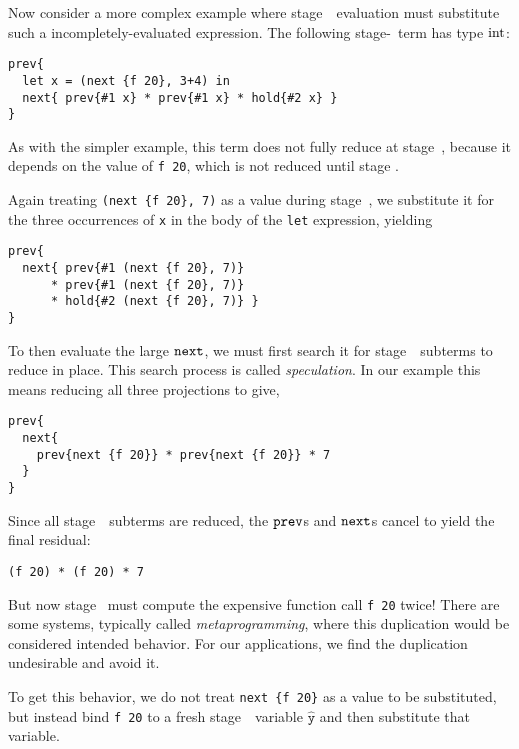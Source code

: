 Now consider a more complex example where stage~\bbone\ evaluation must
substitute such a incompletely-evaluated expression. The following
stage-\bbtwo\ term has type ${\rm int}$:
\begin{lstlisting} 
prev{
  let x = (next {f 20}, 3+4) in
  next{ prev{#1 x} * prev{#1 x} * hold{#2 x} }
}
\end{lstlisting}
As with the simpler example, this term does not fully reduce at stage~\bbone, 
because it depends on the value of \verb|f 20|, which is not reduced until stage \bbtwo.

Again treating \verb|(next {f 20}, 7)| as a value during stage~\bbone, we
substitute it for the three occurrences of \verb|x| in the body of the
\verb|let| expression, yielding
\begin{lstlisting} 
prev{
  next{ prev{#1 (next {f 20}, 7)} 
      * prev{#1 (next {f 20}, 7)} 
      * hold{#2 (next {f 20}, 7)} }
}
\end{lstlisting}
To then evaluate the large ${\tt next}$, we must first search it for stage~\bbone\ subterms to reduce in place.
This search process is called {\em speculation}.
In our example this means reducing all three projections to give,
\begin{lstlisting} 
prev{
  next{ 
    prev{next {f 20}} * prev{next {f 20}} * 7 
  }
}
\end{lstlisting}
Since all stage~\bbone\ subterms are reduced, the ${\tt prev}$s and ${\tt next}$s cancel to yield the final residual:
\begin{lstlisting} 
(f 20) * (f 20) * 7
\end{lstlisting}
But now stage \bbtwo\ must compute the expensive function call \verb|f 20| twice! 
There are some systems, typically called {\em metaprogramming}, 
where this duplication would be considered intended behavior.
For our applications, we find the duplication undesirable and avoid it.

To get this behavior, we do not treat \verb|next {f 20}| as a value to be substituted, 
but instead bind \verb|f 20| to a fresh stage~\bbtwo\ variable $\mathtt{\hat y}$
and then substitute that variable.

